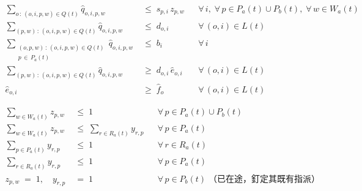 \begin{align}
\sum_{o \,:\, (o,i,p,w) \in Q(t)} \hat{q}_{o,i,p,w}
   \;&\le\; s_{p,i}\, z_{p,w}
   && \forall\, i,\; \forall\, p \in P_a(t) \cup P_b(t),\; \forall\, w \in W_a(t)
   \tag{V1}\\[6pt]
\sum_{(p,w) \,:\, (o,i,p,w) \in Q(t)} \hat{q}_{o,i,p,w}
   \;&\le\; d_{o,i}
   && \forall\, (o,i) \in L(t)
   \tag{V2}\\[6pt]
\sum_{\substack{(o,p,w) \,:\, (o,i,p,w) \in Q(t) \\ p \,\in\, P_a(t)}} \hat{q}_{o,i,p,w}
   \;&\le\; b_i
   && \forall\, i
   \tag{V2a}\\[6pt]
\sum_{(p,w) \,:\, (o,i,p,w) \in Q(t)} \hat{q}_{o,i,p,w}
   \;&\ge\; d_{o,i}\, \hat{e}_{o,i}
   && \forall\, (o,i) \in L(t)
   \tag{V3}\\[6pt]
\hat{e}_{o,i} \;&\ge\; \hat{f}_{o}
   && \forall\, (o,i) \in L(t)
   \tag{V4}
\end{align}

\begin{align}
\sum_{w \in W_a(t)} z_{p,w} \;&\le\; 1
   && \forall\, p \in P_a(t) \cup P_b(t)
   \tag{R1}\\[6pt]
\sum_{w \in W_a(t)} z_{p,w} \;&\le\; \sum_{r \in R_a(t)} y_{r,p}
   && \forall\, p \in P_a(t)
   \tag{R2}\\[6pt]
\sum_{p \in P_a(t)} y_{r,p} \;&\le\; 1
   && \forall\, r \in R_a(t)
   \tag{R3}\\[6pt]
\sum_{r \in R_a(t)} y_{r,p} \;&\le\; 1
   && \forall\, p \in P_a(t)
   \tag{R4}\\[6pt]
z_{p,w} \;=\; 1,\quad y_{r,p} \;&=\; 1
   && \forall\, p \in P_b(t) \;\text{（已在途，釘定其既有指派）}
   \tag{R5}
\end{align}


